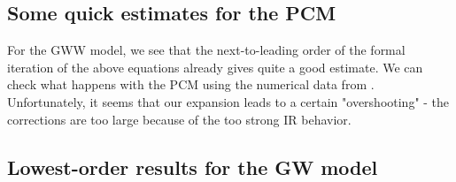 \documentclass[twocolumn,showpacs,preprintnumbers,superscriptaddress,amsmath,floatfix,amssymb,secnumarabic]{revtex4}
\begin{document}
\subsection{Some quick estimates for the PCM}

 For the GWW model, we see that the next-to-leading order of the formal iteration of the above equations already gives quite a good estimate. We can check what happens with the PCM using the numerical data from \cite{Rossi:94:1}. Unfortunately, it seems that our expansion leads to a certain "overshooting" - the corrections are too large because of the too strong IR behavior. 

\subsection{Lowest-order results for the GW model}
\end{document}
